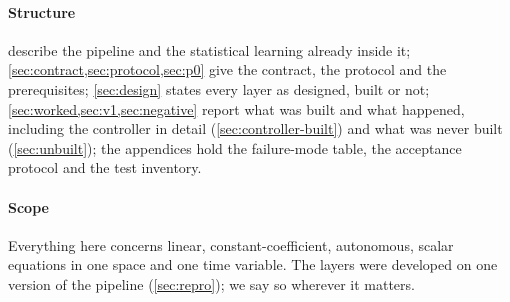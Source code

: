 \paragraph{Structure}  describe the pipeline and the statistical learning already inside it; \cref{sec:contract,sec:protocol,sec:p0} give the contract, the protocol and the prerequisites; \cref{sec:design} states every layer as designed, built or not;
\cref{sec:worked,sec:v1,sec:negative} report what was built and what happened, including the controller in detail (\cref{sec:controller-built}) and what was never built (\cref{sec:unbuilt}); the appendices hold the failure-mode table, the acceptance protocol and the test inventory.

\paragraph{Scope} Everything here concerns linear, constant-coefficient, autonomous, scalar equations in one space and one
time variable. The layers were developed on one version of the pipeline (\cref{sec:repro}); we say so wherever it matters.

